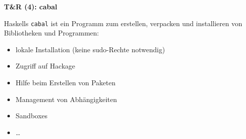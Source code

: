 \documentclass[unknownkeysallowed]{beamer}
\begin{document}
  \begin{frame}
    \Large\textbf{T\&R (4): cabal}\bigskip \normalsize
    
    Haskells \texttt{cabal} ist ein Programm zum erstellen, verpacken und installieren
    von Bibliotheken und Programmen:
    
    \begin{itemize}
    \item lokale Installation (keine sudo-Rechte notwendig)
    \item Zugriff auf Hackage 
    \item Hilfe beim Erstellen von Paketen
    \item Management von Abhängigkeiten
    \item Sandboxes
    \item \dots
    \end{itemize}
  \end{frame}
  
  
\end{document}

